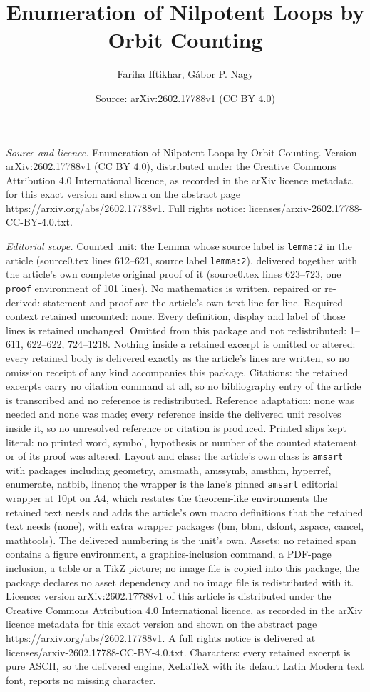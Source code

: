 \documentclass[10pt,a4paper]{amsart}
\title[Enumeration of Nilpotent Loops by Orbit Counting]{Enumeration of Nilpotent Loops by Orbit Counting}
\author{Fariha Iftikhar, G\'abor P. Nagy}
\date{Source: arXiv:2602.17788v1 (CC BY 4.0)}
\begin{document}
\maketitle

\noindent\emph{Source and licence.} Enumeration of Nilpotent Loops by Orbit Counting. Version arXiv:2602.17788v1 (CC BY 4.0), distributed under the Creative Commons Attribution 4.0 International licence, as recorded in the arXiv licence metadata for this exact version and shown on the abstract page https://arxiv.org/abs/2602.17788v1. Full rights notice: licenses/arxiv-2602.17788-CC-BY-4.0.txt.\par\smallskip

\noindent\textit{Editorial scope.} Counted unit: the Lemma whose source label is \texttt{lemma:2} in the article (source0.tex lines 612--621, source label \texttt{lemma:2}), delivered together with the article's own complete original proof of it (source0.tex lines 623--723, one \texttt{proof} environment of 101 lines). No mathematics is written, repaired or re-derived: statement and proof are the article's own text line for line. Required context retained uncounted: none. Every definition, display and label of those lines is retained unchanged. Omitted from this package and not redistributed: 1--611, 622--622, 724--1218. Nothing inside a retained excerpt is omitted or altered: every retained body is delivered exactly as the article's lines are written, so no omission receipt of any kind accompanies this package. Citations: the retained excerpts carry no citation command at all, so no bibliography entry of the article is transcribed and no reference is redistributed. Reference adaptation: none was needed and none was made; every reference inside the delivered unit resolves inside it, so no unresolved reference or citation is produced. Printed slips kept literal: no printed word, symbol, hypothesis or number of the counted statement or of its proof was altered. Layout and class: the article's own class is \texttt{amsart} with packages including geometry, amsmath, amssymb, amsthm, hyperref, enumerate, natbib, lineno; the wrapper is the lane's pinned \texttt{amsart} editorial wrapper at 10pt on A4, which restates the theorem-like environments the retained text needs and adds the article's own macro definitions that the retained text needs (none), with extra wrapper packages (bm, bbm, dsfont, xspace, cancel, mathtools). The delivered numbering is the unit's own. Assets: no retained span contains a figure environment, a graphics-inclusion command, a PDF-page inclusion, a table or a TikZ picture; no image file is copied into this package, the package declares no asset dependency and no image file is redistributed with it. Licence: version arXiv:2602.17788v1 of this article is distributed under the Creative Commons Attribution 4.0 International licence, as recorded in the arXiv licence metadata for this exact version and shown on the abstract page https://arxiv.org/abs/2602.17788v1. A full rights notice is delivered at licenses/arxiv-2602.17788-CC-BY-4.0.txt. Characters: every retained excerpt is pure ASCII, so the delivered engine, XeLaTeX with its default Latin Modern text font, reports no missing character.
\end{document}
